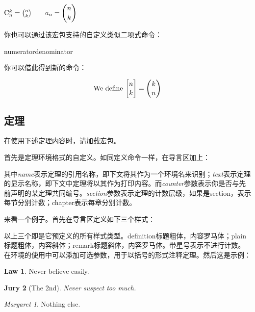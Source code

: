 \begin{codeshow}
$\mathrm{C}_n^k=\binom{n}{k}
\qquad a_n=\dbinom{n}{k}$
\end{codeshow}

你也可以通过该宏包支持的自定义类似二项式命令：
\begin{latex}
{numerator}{denominator}
\newcommand{\Bfrac}[2]{\genfrac{[}{]}{0pt}{}{#1}{#2}}
\end{latex}

你可以借此得到新的命令：
\begin{codeshow}
\[\text{We define }\Bfrac{n}{k}=\binom{k}{n}\]
\end{codeshow}

\subsection{定理}
在使用下述定理内容时，请加载宏包。

首先是定理环境格式的自定义。如同定义命令一样，在导言区加上：
\begin{latex}
\newtheorem{envname}[counter]{text}[section]
\end{latex}

其中\textit{name}表示定理的引用名称，即下文将其作为一个环境名来识别；\textit{text}表示定理的显示名称，即下文中定理将以其作为打印内容。而\textit{counter}参数表示你是否与先前声明的某定理共同编号。\textit{section}参数表示定理的计数层级，如果是section，表示每节分别计数；chapter表示每章分别计数。

来看一个例子。首先在导言区定义如下三个样式：
\begin{latex}
\theoremstyle{definition}\newtheorem{laws}{Law}[section]
\theoremstyle{plain}\newtheorem{ju}[laws]{Jury}
\theoremstyle{remark}\newtheorem*{marg}{Margaret}
\end{latex}

以上三个即是它预定义的所有样式类型。definition标题粗体，内容罗马体；plain标题粗体，内容斜体；remark标题斜体，内容罗马体。带星号表示不进行计数。在环境的使用中可以添加可选参数，用于以括号的形式注释定理。然后这是示例：

\begin{codeshow}
\begin{laws}
Never believe easily.
\end{laws}
\begin{ju}[The 2nd]
Never suspect too much.
\end{ju}
\begin{marg}Nothing else.\end{marg}
\end{codeshow}

